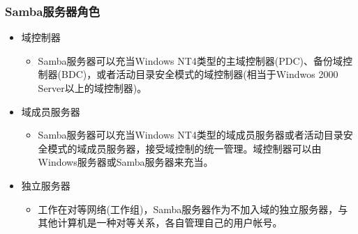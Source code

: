 \documentclass[xcolor=svgnames,presentation]{beamer}
\begin{document}
\begin{frame}
\frametitle{Samba服务器角色}
\label{sec-2-2}
\begin{itemize}

\item 域控制器
\label{sec-2-2-1}%
\begin{itemize}

\item Samba服务器可以充当Windows NT4类型的主域控制器(PDC)、备份域控制器(BDC)，或者活动目录安全模式的域控制器(相当于Windwos 2000 Server以上的域控制器)。
\label{sec-2-2-1-1}%
\end{itemize} %

\item 域成员服务器
\label{sec-2-2-2}%
\begin{itemize}

\item Samba服务器可以充当Windows NT4类型的域成员服务器或者活动目录安全模式的域成员服务器，接受域控制的统一管理。域控制器可以由Windows服务器或Samba服务器来充当。
\label{sec-2-2-2-1}%
\end{itemize} %

\item 独立服务器
\label{sec-2-2-3}%
\begin{itemize}

\item 工作在对等网络(工作组)，Samba服务器作为不加入域的独立服务器，与其他计算机是一种对等关系，各自管理自己的用户帐号。
\label{sec-2-2-3-1}%
\end{itemize} %
\end{itemize} %
\end{frame}
\end{document}
